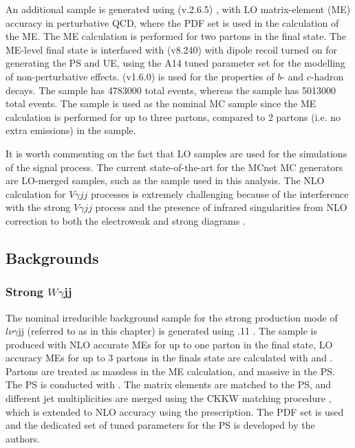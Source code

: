 An additional \ewwy sample is generated using \MGNLO (v.2.6.5) \cite{VBSWy:madgraph}, with LO matrix-element (ME) accuracy in perturbative QCD, where the \NNPDFtwolo \cite{Insitu:nnpdf} PDF set is used in the calculation of the ME. The ME calculation is performed for two partons in the final state. The ME-level final state is interfaced with \PYTHIA (v8.240) \cite{Insitu:pythia} with dipole recoil turned on for generating the PS and UE, using the A14 \cite{VBSWy:a14} tuned parameter set for the modelling of non-perturbative effects. \EVTGEN (v1.6.0) \cite{Insitu:evtgen} is used for the properties of $b$- and $c$-hadron decays. The \SHERPA sample has 4783000 total events, whereas the \MGNLO sample has 5013000 total events. The \SHERPA sample is used as the nominal MC sample since the ME calculation is performed for up to three partons, compared to 2 partons (i.e. no extra emissions) in the \MGNLO sample.

It is worth commenting on the fact that LO samples are used for the simulations of the signal process. The current state-of-the-art for the MCnet MC generators are LO-merged samples, such as the \SHERPA \ewwy sample used in this analysis. The NLO calculation for $V\gamma jj$ processes is extremely challenging because of the interference with the strong $V\gamma jj$ process and the presence of infrared singularities from NLO correction to both the electroweak and strong diagrams \cite{VBSWy:VBSNLO,VBSWy:MCNetVBSNLO}. 
\subsection{Backgrounds}

\subsubsection{Strong $W\gamma$jj}
The nominal irreducible background sample for the strong production mode of $l\nu\gamma$jj (referred to as \qcdwy in this chapter) is generated using .11 \cite{Insitu:sherpa,Insitu:sherpa22}. The sample is produced with NLO accurate MEs for up to one parton in the final state, LO accuracy MEs for up to 3 partons in the finals state are calculated with \AMEGIC \cite{VBSWy:amegic} and \COMIX \cite{Insitu:comix}. Partons are treated as massless in the ME calculation, and massive in the PS. The PS is conducted with \CSShower \cite{Insitu:csshower}. The matrix elements are matched to the PS, and different jet multiplicities are merged using the CKKW matching procedure \cite{Insitu:ckkw1,Insitu:ckkw2}, which is extended to NLO accuracy using the \MEPSatNLO \cite{Insitu:meps} prescription. The \NNPDF \cite{Insitu:nnpdf} PDF set is used and the dedicated set of tuned parameters for the PS is developed by the \SHERPA authors. 

